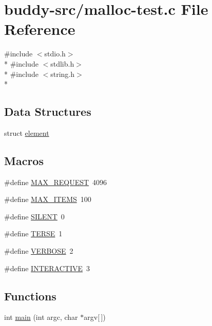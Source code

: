 \hypertarget{malloc-test_8c}{}\section{buddy-\/src/malloc-\/test.c File Reference}
\label{malloc-test_8c}
{\ttfamily \#include $<$stdio.\+h$>$}\\*
{\ttfamily \#include $<$stdlib.\+h$>$}\\*
{\ttfamily \#include $<$string.\+h$>$}\\*
\subsection*{Data Structures}
\begin{DoxyCompactItemize}
\item 
struct \hyperlink{structelement}{element}
\end{DoxyCompactItemize}
\subsection*{Macros}
\begin{DoxyCompactItemize}
\item 
\#define \hyperlink{malloc-test_8c_a79dc55ceff5acfd97aabd01db632a266}{M\+A\+X\+\_\+\+R\+E\+Q\+U\+E\+S\+T}~4096
\item 
\#define \hyperlink{malloc-test_8c_a1b40ceb455086d9cdb68ed3d3bf2775f}{M\+A\+X\+\_\+\+I\+T\+E\+M\+S}~100
\item 
\#define \hyperlink{malloc-test_8c_a404d5107b2cc06d2e236b7320df1fa7d}{S\+I\+L\+E\+N\+T}~0
\item 
\#define \hyperlink{malloc-test_8c_ae70000f46dd84121830128e1701090ee}{T\+E\+R\+S\+E}~1
\item 
\#define \hyperlink{malloc-test_8c_a42f8c497a1968074f38bf5055c650dca}{V\+E\+R\+B\+O\+S\+E}~2
\item 
\#define \hyperlink{malloc-test_8c_aa68dfac40a260bde9272c46bdf82613a}{I\+N\+T\+E\+R\+A\+C\+T\+I\+V\+E}~3
\end{DoxyCompactItemize}
\subsection*{Functions}
\begin{DoxyCompactItemize}
\item 
int \hyperlink{malloc-test_8c_a0ddf1224851353fc92bfbff6f499fa97}{main} (int argc, char $\ast$argv\mbox{[}$\,$\mbox{]})
\end{DoxyCompactItemize}
